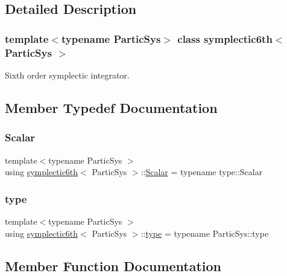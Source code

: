 \subsection{Detailed Description}
\subsubsection*{template$<$typename Partic\+Sys$>$\newline
class symplectic6th$<$ Partic\+Sys $>$}

Sixth order symplectic integrator. 

\subsection{Member Typedef Documentation}
\mbox{\label{classsymplectic6th_a1059d63d55058db7c6ab5b71e097f3ee}} 
\subsubsection{\texorpdfstring{Scalar}{Scalar}}
{\footnotesize\ttfamily template$<$typename Partic\+Sys $>$ \\
using \mbox{\hyperlink{classsymplectic6th}{symplectic6th}}$<$ Partic\+Sys $>$\+::\mbox{\hyperlink{classsymplectic6th_a1059d63d55058db7c6ab5b71e097f3ee}{Scalar}} =  typename type\+::\+Scalar}

\mbox{\label{classsymplectic6th_a8c8736cf1193abff40c406149a32ee78}} 
\subsubsection{\texorpdfstring{type}{type}}
{\footnotesize\ttfamily template$<$typename Partic\+Sys $>$ \\
using \mbox{\hyperlink{classsymplectic6th}{symplectic6th}}$<$ Partic\+Sys $>$\+::\mbox{\hyperlink{classsymplectic6th_a8c8736cf1193abff40c406149a32ee78}{type}} =  typename Partic\+Sys\+::type}



\subsection{Member Function Documentation}
\mbox{\label{classsymplectic6th_ae1e6b8a64e8db932df8e1afb4ff23e0a}} 
